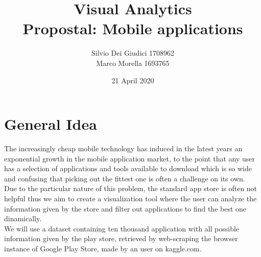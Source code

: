 \documentclass[a4paper, 11pt]{article}
\title { Visual Analytics\\ \bigskip \large Propostal: Mobile applications}
\date{21 April 2020}
\author{Silvio Dei Giudici 1708962 \\ Marco Morella 1693765}
\begin{document}
\maketitle

\section{General Idea}
The increasingly cheap mobile technology has induced in the latest years an exponential growth in the mobile application market, to the point that any user has a selection of applications and tools available to download which is so wide and confusing that picking out the fittest one is often a challenge on its own.\\
Due to the particular nature of this problem, the standard app store is often not helpful thus we aim to create a visualization tool where the user can analyze the information given by the store and filter out applications to find the best one dinamically.\\
We will use a dataset containing ten thousand application with all possible information given by the play store, retrieved by web-scraping the browser instance of Google Play Store, made by an user on kaggle.com.\\
\end{document}
